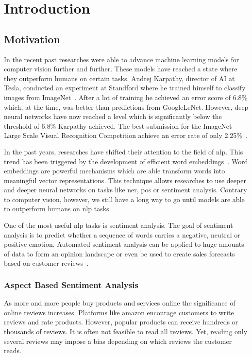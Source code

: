 \chapter{Introduction}
\label{chap:introduction}

\section{Motivation}
\label{sec:introduction_motivation}

In the recent past researches were able to advance machine learning models for computer vision further and further. These models have reached a state where they outperform humans on certain tasks. Andrej Karpathy, director of AI at Tesla, conducted an experiment at Standford where he trained himself to classify images from ImageNet~\cite{Karpathy2014}. After a lot of training he achieved an error score of 6.8\% which, at the time, was better than predictions from GoogleLeNet. However, deep neural networks have now reached a level which is significantly below the threshold of 6.8\% Karpathy achieved. The best submission for the ImageNet Large Scale Visual Recognition Competition achieve an error rate of only 2.25\%~\cite{Hu2018}.
\bigskip

In the past years, researches have shifted their attention to the field of \acrfull{nlp}. This trend has been triggered by the development of efficient word embeddings~\cite{Mikolov2013c}. Word embeddings are powerful mechanisms which are able transform words into meaningful vector representations. This technique allows researches to use deeper and deeper neural networks on tasks like \gls{ner}, \gls{pos} or sentiment analysis. Contrary to computer vision, however, we still have a long way to go until models are able to outperform humans on \gls{nlp} tasks.
\bigskip

One of the most useful \gls{nlp} tasks is sentiment analysis. The goal of sentiment analysis is to predict whether a sequence of words carries a negative, neutral or positive emotion. Automated sentiment analysis can be applied to huge amounts of data to form an opinion landscape or even be used to create sales forecasts based on customer reviews~\cite{Shen2015}. 
\medskip

\subsection*{Aspect Based Sentiment Analysis}

As more and more people buy products and services online the significance of online reviews increases. Platforms like amazon encourage customers to write reviews and rate products. However, popular products can receive hundreds or thousands of reviews. It is often not feasible to read all reviews. Yet, reading only several reviews may impose a bias depending on which reviews the customer reads.
\medskip

